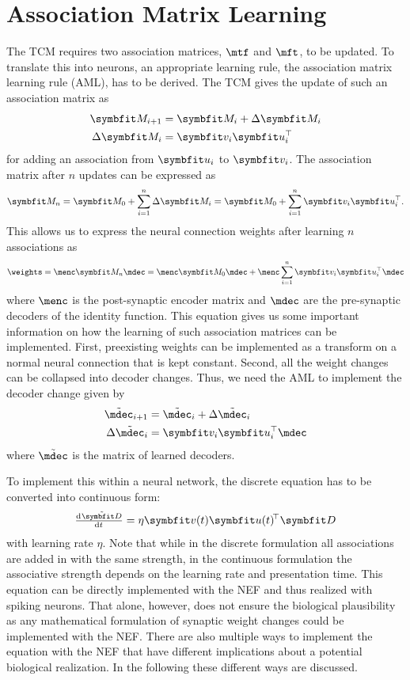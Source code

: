 \chapter{Association Matrix Learning}\label{sec:aml}

The TCM requires two association matrices, $\mtf$ and $\mft$, to be updated.
To translate this into neurons, an appropriate learning rule, the association matrix learning rule (AML), has to be derived.
The TCM gives the update of such an association matrix as
\begin{align}
    \mat M_{i+1} &= \mat M_i + \Delta \mat M_i \\
    \Delta \mat M_i &= \vc v_i \vc u_i\Tr
\end{align}
for adding an association from $\vc u_i$ to $\vc v_i$.
The association matrix after $n$ updates can be expressed as
\begin{equation}
    \mat M_n = \mat M_0 + \sum_{i=1}^{n} \Delta \mat M_i = \mat M_0 + \sum_{i=1}^n \vc v_i \vc u_i\Tr \text{.}
\end{equation}
This allows us to express the neural connection weights after learning $n$ associations as
\begin{equation}
    \weights = \menc \mat M_n \mdec = \menc \mat M_0 \mdec + \menc \sum_{i=1}^n \vc v_i \vc u_i\Tr \mdec
\end{equation}
where $\menc$ is the post-synaptic encoder matrix and $\mdec$ are the pre-synaptic decoders of the identity function.
This equation gives us some important information on how the learning of such association matrices can be implemented.
First, preexisting weights can be implemented as a transform on a normal neural connection that is kept constant.
Second, all the weight changes can be collapsed into decoder changes.
Thus, we need the AML to implement the decoder change given by
\begin{align}
    \tilde{\mdec}_{i+1} &= \tilde{\mdec}_i + \Delta \tilde{\mdec}_i \\
    \Delta \tilde{\mdec}_i &= \vc v_i \vc u_i\Tr \mdec
\end{align}
where $\tilde{\mdec}$ is the matrix of learned decoders.

To implement this within a neural network, the discrete equation has to be converted into continuous form:
\begin{equation}
    \od{\tilde{\mat D}}{t} = \eta \vc v(t) \vc u(t)\!\Tr \mat D \label{eqn:aml}
\end{equation}
with learning rate $\eta$.
Note that while in the discrete formulation all associations are added in with the same strength, in the continuous formulation the associative strength depends on the learning rate and presentation time.
This equation can be directly implemented with the NEF and thus realized with spiking neurons.
That alone, however, does not ensure the biological plausibility as any mathematical formulation of synaptic weight changes could be implemented with the NEF\@.
There are also multiple ways to implement the equation with the NEF that have different implications about a potential biological realization.
In the following these different ways are discussed.



